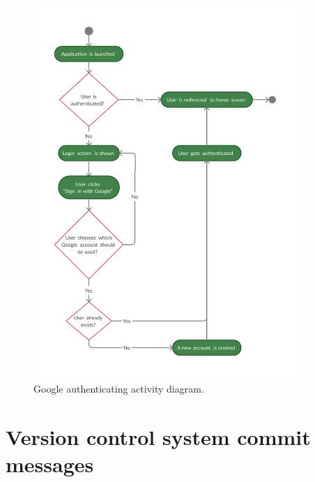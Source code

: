 \documentclass[
  digital, %
  table,   %
  oneside, %
  lof,     %
  lot,     %
]{fithesis3}
\begin{document}
    \begin{figure}
        \begin{center}
            \includegraphics[width=0.9\textwidth]{figures/diagrams/google_auth_flow}
        \end{center}
        \caption{Google authenticating activity diagram.}
        \label{fig:google_auth_flow}
    \end{figure}
    
\section{Version control system commit messages}
\end{document}
